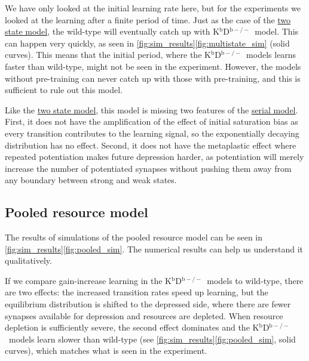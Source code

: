 \documentclass[10pt]{article}
\newcommand{\KO}{K$^\mathrm{b}$D$^{\mathrm{b}-/-}$}
\begin{document}
We have only looked at the initial learning rate here, but for the experiments we looked at the learning after a finite period of time.
Just as the case of the  \hyperref[sec:binary]{two state model}, the wild-type will eventually catch up with \KO\ model.
This can happen very quickly, as seen in \autoref{fig:sim_results}\ref{fig:multistate_sim} (solid curves).
This means that the initial period, where the \KO\ models learns faster than wild-type, might not be seen in the experiment.
However, the models without pre-training can never catch up with those with pre-training, and this is sufficient to rule out this model.


Like the \hyperref[sec:binary]{two state model}, this model is missing two features of the \hyperref[sec:multistate]{serial model}.
First, it does not have the amplification of the effect of initial saturation bias as every transition contributes to the learning signal, so the exponentially decaying distribution has no effect.
Second, it does not have the metaplastic effect where repeated potentiation makes future depression harder, as potentiation will merely increase the number of potentiated synapses without pushing them away from any boundary between strong and weak states.





\subsection{Pooled resource model}\label{sec:pooled}
%
%
%
%


The results of simulations of the pooled resource model can be seen in
\autoref{fig:sim_results}\ref{fig:pooled_sim}. %
The numerical results can help us understand it qualitatively.

If we compare gain-increase learning in the \KO\ models to wild-type, there are two effects: the increased transition rates speed up learning, but the equilibrium distribution is shifted to the depressed side,
where there are fewer synapses available for depression and resources are depleted.
When resource depletion is sufficiently severe, the second effect dominates and the \KO\ models learn slower than wild-type (see \autoref{fig:sim_results}\ref{fig:pooled_sim}, %
solid curves), which matches what is seen in the experiment.
\end{document}
